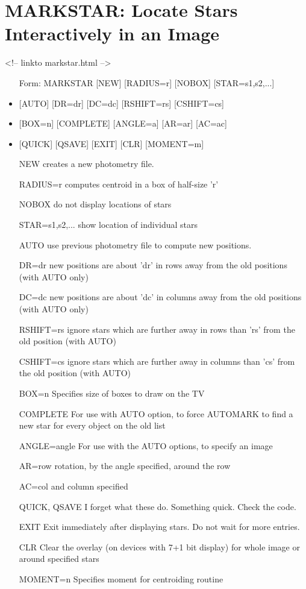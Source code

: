 \section{MARKSTAR: Locate Stars Interactively in an Image}
\begin{rawhtml}
<!-- linkto markstar.html -->
\end{rawhtml}
\begin{itemize}
  \item[Form: MARKSTAR {[NEW]} {[RADIUS=r]} {[NOBOX]} {[STAR=s1,s2,...]}\hfill]{}
  \item{{[AUTO]} {[DR=dr]} {[DC=dc]} {[RSHIFT=rs]} {[CSHIFT=cs]} }
  \item{{[BOX=n]} {[COMPLETE]} {[ANGLE=a]} {[AR=ar]} {[AC=ac]}}
  \item{{[QUICK]} {[QSAVE]} {[EXIT]} {[CLR]} {[MOMENT=m]}}
  \item[NEW]{creates a new photometry file.}
  \item[RADIUS=r]{computes centroid in a box of half-size 'r'}
  \item[NOBOX]{do not display locations of stars}
  \item[STAR=s1,s2,...]{show location of individual stars}
  \item[AUTO]{use previous photometry file to compute new
positions.}
  \item[DR=dr]{new positions are about 'dr' in rows away
from the old positions (with AUTO only)}
  \item[DC=dc]{new positions are about 'dc' in columns away
from the old positions (with AUTO only)}
  \item[RSHIFT=rs]{ignore stars which are further away in rows
than 'rs' from the old position (with AUTO)}
  \item[CSHIFT=cs]{ignore stars which are further away in columns
than 'cs' from the old position (with AUTO)}
  \item[BOX=n]{Specifies size of boxes to draw on the TV}
  \item[COMPLETE]{For use with AUTO option, to force AUTOMARK to
find a new star for every object on the old list}
  \item[ANGLE=angle]{     For use with the AUTO options, to specify an image}
  \item[AR=row]{rotation, by the angle specified, around the row}
  \item[AC=col]{and column specified}
  \item[QUICK, QSAVE]{I forget what these do. Something quick. Check the code.}
  \item[EXIT]{Exit immediately after displaying stars. Do not
wait for more entries.}
  \item[CLR]{Clear the overlay (on devices with 7+1 bit display)
for whole image or around specified stars}
  \item[MOMENT=n]{Specifies moment for centroiding routine}
\end{itemize}


